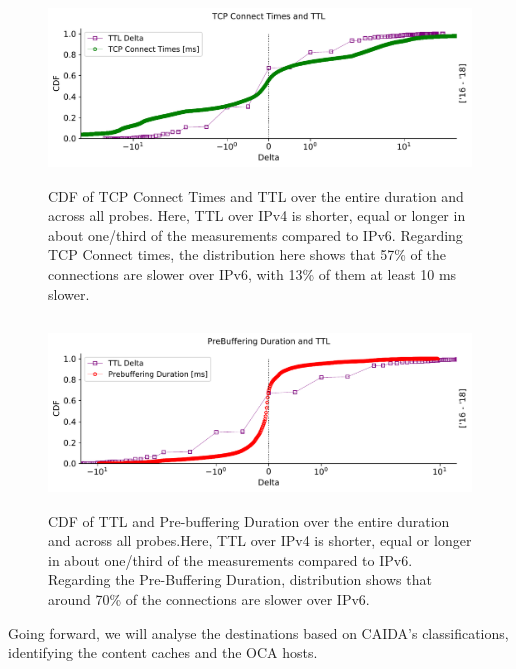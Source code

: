 \begin{figure}[!ht]
	\centering
	\includegraphics[keepaspectratio, height=5cm, width=15cm]{figures/traceroute/netflix-traceroute-median-ttl-tcp-cdf.pdf}
	\caption[TTL and TCP CDF Delta]{CDF of TCP Connect Times and TTL over the entire duration and across all probes. Here, TTL over IPv4 is shorter, equal or longer in about one/third of the measurements compared to IPv6. Regarding TCP Connect times, the distribution here shows that 57\% of the connections are slower over IPv6, with 13\% of them at least 10 ms slower.}
	\label{fig:TTL and TCP CDF Delta}
\end{figure}

\begin{figure}[!ht]
	\centering
	\includegraphics[keepaspectratio, height=5cm, width=15cm]{figures/traceroute/netflix-traceroute-median-ttl-pd-cdf.pdf}
	\caption[TTL and PreBuffering Duration CDF Delta]{CDF of TTL and Pre-buffering Duration over the entire duration and across all probes.Here, TTL over IPv4 is shorter, equal or longer in about one/third of the measurements compared to IPv6. Regarding the Pre-Buffering Duration, distribution shows that around 70\% of the connections are slower over IPv6.}
	\label{fig:TTL and PreBuffering Duration CDF Delta}
\end{figure}

Going forward, we will analyse the destinations based on CAIDA's \cite{caida} classifications, identifying the content caches and the OCA hosts.

\FloatBarrier

